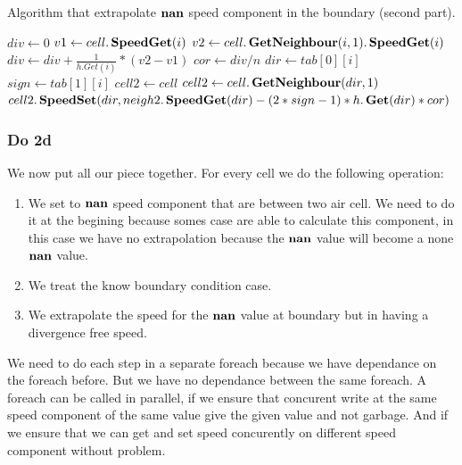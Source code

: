 \begin{algorithm}
\caption{Algorithm that extrapolate $\mathop{\textbf{nan}}$ speed component in the boundary (second part).}
\label{code:ApplyNanExtrap2}
\begin{algorithmic}[1]
	\State $div \gets 0$ 
	\State $v1 \gets cell.\mathop{\textbf{SpeedGet}}(i)$
	\State $v2 \gets cell.\mathop{\textbf{GetNeighbour}}(i,1).\mathop{\textbf{SpeedGet}}(i)$
	\State $div \gets div+\frac{1}{h.Get(i)}*(v2-v1)$
	\EndFor
	\State $cor \gets div/n$
	\State $dir \gets tab[0][i]$
	\State $sign \gets tab[1][i]$
	\State $cell2 \gets cell$
		\State $cell2 \gets cell.\mathop{\textbf{GetNeighbour}}(dir,1)$
	\EndIf
	\State $cell2.\mathop{\textbf{SpeedSet}}(dir,neigh2.\mathop{\textbf{SpeedGet}}(dir)-(2*sign-1)*h.\mathop{\textbf{Get}}(dir)*cor)$
	\EndFor
\EndFunction
\end{algorithmic}
\end{algorithm}

\subsubsection{Do 2d}

We now put all our piece together.
For every cell we do the following operation:
\begin{enumerate}
\item We set to $\mathop{\textbf{nan}}$ speed component that are between two air cell.
We need to do it at the begining because somes case are able to calculate this component,
in this case we have no extrapolation because the $\mathop{\textbf{nan}}$ value will become a none $\mathop{\textbf{nan}}$ value.
\item We treat the know boundary condition case.
\item We extrapolate the speed for the $\mathop{\textbf{nan}}$ value at boundary but in having a divergence free speed.
\end{enumerate}

We need to do each step in a separate foreach because we have dependance on the foreach before.
But we have no dependance between the same foreach.
A foreach can be called in parallel, if we ensure that concurent write at the same speed component of the same value
give the given value and not garbage.
And if we ensure that we can get and set speed concurently on different speed component without problem.

